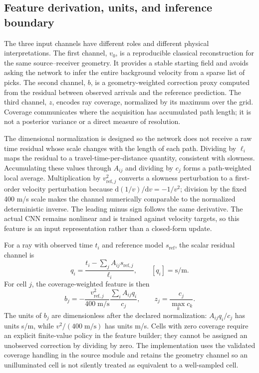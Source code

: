 \documentclass[11pt]{article}
\begin{document}
\subsection{Feature derivation, units, and inference boundary}
The three input channels have different roles and different physical interpretations. The first channel, $v_0$, is a reproducible classical reconstruction for the same source--receiver geometry. It provides a stable starting field and avoids asking the network to infer the entire background velocity from a sparse list of picks. The second channel, $b$, is a geometry-weighted correction proxy computed from the residual between observed arrivals and the reference prediction. The third channel, $z$, encodes ray coverage, normalized by its maximum over the grid. Coverage communicates where the acquisition has accumulated path length; it is not a posterior variance or a direct measure of resolution.

The dimensional normalization is designed so the network does not receive a raw time residual whose scale changes with the length of each path. Dividing by $\ell_i$ maps the residual to a travel-time-per-distance quantity, consistent with slowness. Accumulating these values through $A_{ij}$ and dividing by $c_j$ forms a path-weighted local average. Multiplication by $v_{\mathrm{ref},j}^2$ converts a slowness perturbation to a first-order velocity perturbation because $\mathrm{d}(1/v)/\mathrm{d}v=-1/v^2$; division by the fixed 400 m/s scale makes the channel numerically comparable to the normalized deterministic inverse. The leading minus sign follows the same derivative. The actual CNN remains nonlinear and is trained against velocity targets, so this feature is an input representation rather than a closed-form update.

For a ray with observed time $t_i$ and reference model $s_{\mathrm{ref}}$, the scalar residual channel is
\begin{equation}\label{eq:normalized-ray-residual}
q_i=\frac{t_i-\sum_j A_{ij}s_{\mathrm{ref},j}}{\ell_i},\qquad [q_i]=\mathrm{s/m}.
\end{equation}
For cell $j$, the coverage-weighted feature is then
\begin{equation}\label{eq:coverage-backprojection}
b_j=-\frac{v_{\mathrm{ref},j}^{2}}{400\;\mathrm{m/s}}\frac{\sum_i A_{ij}q_i}{c_j},\qquad z_j=\frac{c_j}{\max_k c_k}.
\end{equation}
The units of $b_j$ are dimensionless after the declared normalization: $A_{ij}q_i/c_j$ has units s/m, while $v^2/(400\;\mathrm{m/s})$ has units m/s. Cells with zero coverage require an explicit finite-value policy in the feature builder; they cannot be assigned an unobserved correction by dividing by zero. The implementation uses the validated coverage handling in the source module and retains the geometry channel so an unilluminated cell is not silently treated as equivalent to a well-sampled cell.
\end{document}
